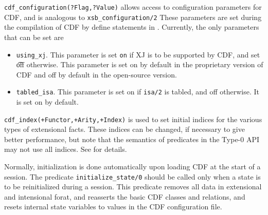 \begin{description}


{\tt cdf\_configuration(?Flag,?Value)} allows access to configuration
parameters for CDF, and is analogous to {\tt xsb\_configuration/2}
These parameters are set during the compilation of CDF by define
statements in .  Currently, the only
parameters that can be set are
\begin{itemize}
\item {\tt using\_xj}.  This parameter is set {\tt on} if XJ is to be
supported by CDF, and set {\t off} otherwise.  This parameter is set on by
default in the proprietary version of CDF and off by default in the
open-source version.

\item {\tt tabled\_isa}.  This parameter is set on if {\tt isa/2} is
tabled, and off otherwise.  It is set on by default.
\end{itemize}

{\tt cdf\_index(+Functor,+Arity,+Index)} is used to set initial
indices for the various types of extensional facts. These indices can
be changed, if necessary to give better performance, but note that the
semantics of predicates in the Type-0 API may not use all indices.
See  for details.

Normally, initialization is done automatically upon loading CDF at the
start of a session.  The predicate {\tt initialize\_state/0} should be
called only when a state is to be reinitialized during a session.
This predicate removes all data in extensional and intensional forat,
and reasserts the basic CDF classes and relations, and resets internal
state variables to values in the CDF configuration file.

\end{description}

